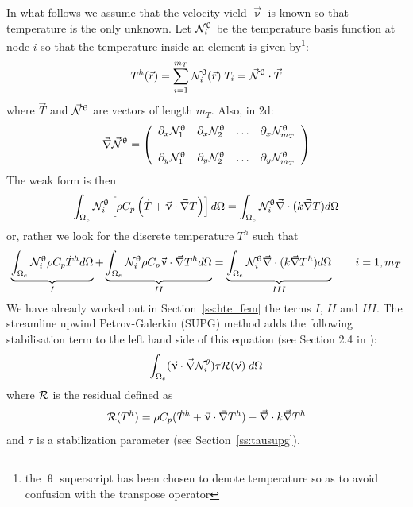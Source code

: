 In what follows we assume that the velocity vield $\vec \upnu$ is known so that temperature is the
only unknown.
Let ${\mathcal{N}}^\uptheta_i$ be the temperature basis function at node $i$ so that the temperature inside an element is
given by\footnote{the $\uptheta$ superscript has been chosen to denote temperature so as to avoid confusion
with the transpose operator}:
\begin{equation}
T^h({\vec r}) = \sum_{i=1}^{m_T} {\mathcal{N}}^\uptheta_i ({\vec r})\;  T_i = \vec {{\mathcal{N}}}^\uptheta \cdot \vec T
\end{equation}
where $\vec T$ and $\vec {{\mathcal{N}}}^\uptheta$ are vectors of length $m_T$. Also, in 2d:
\[
\vec \nabla \vec {{\mathcal{N}}}^\uptheta = 
\left(
\begin{array}{cccc}
\partial_x {\mathcal{N}}_1^\uptheta & 
\partial_x {\mathcal{N}}_2^\uptheta & \dots &
\partial_x {\mathcal{N}}_{m_T}^\uptheta \\ \\
\partial_y {\mathcal{N}}_1^\uptheta & 
\partial_y {\mathcal{N}}_2^\uptheta & \dots &
\partial_y {\mathcal{N}}_{m_T}^\uptheta 
\end{array}
\right)
\]
The weak form is then
\begin{equation}
\int_{\Omega_e} {\mathcal{N}}^\uptheta_i \left[ 
\rho C_p \left( \dot{T} + {\vec \upnu}\cdot {\vec\nabla T} \right) \right] d\Omega
= \int_{\Omega_e}  {\mathcal{N}}^\uptheta_i {\vec \nabla} \cdot (k \vec\nabla T ) d\Omega
\end{equation}
or, rather we look for the discrete temperature $T^h$ such that
\[
\underbrace{\int_{\Omega_e} {\mathcal{N}}^\uptheta_i  \rho C_p \dot{T}^h d\Omega}_{I}
+ \underbrace{\int_{\Omega_e} {\mathcal{N}}^\uptheta_i  \rho C_p  {\vec \upnu}\cdot {\vec\nabla T^h}   d\Omega}_{II}
= \underbrace{\int_{\Omega_e}  {\mathcal{N}}^\uptheta_i {\vec \nabla} \cdot (k \vec\nabla T^h )d\Omega}_{III}
\quad\quad
i=1,m_T
\]
We have already worked out in Section~\ref{ss:hte_fem} the terms $I$, $II$ and $III$.
The streamline upwind Petrov-Galerkin (SUPG) 
method adds the following stabilisation term to the left hand side of this equation (see Section 2.4 
in \textcite{dohu03}):
\begin{equation}
\int_{\Omega_e} (\vec\upnu\cdot\vec\nabla {\mathcal{N}}_i^\theta ) \tau {\cal R}(\vec\upnu) \; d\Omega
\label{eq:supg:res1}
\end{equation}
where ${\cal R}$ is the residual defined as
\begin{equation}
{\cal R}(T^h) = 
\rho C_p (\dot{T}^h +  {\vec \upnu}\cdot {\vec\nabla T^h}) - {\vec \nabla} \cdot k \vec\nabla T^h 
\label{eq:supg:res2}
\end{equation}
and $\tau$ is a stabilization parameter (see Section~\ref{ss:tausupg}).

